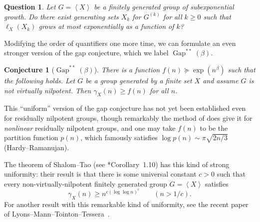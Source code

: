 \documentclass[11pt,reqno]{amsart}
\numberwithin{equation}{section}
\newtheorem*{question}{Question}
\newtheorem*{conjecture}{Conjecture}
\theoremstyle{definition}
\theoremstyle{remark}
\newcommand\opr[1]{\operatorname{#1}}
\newcommand\gen[1]{\left\langle#1\right\rangle}
\def\Gap{\opr{Gap}}
\numberwithin{equation}{section}
\begin{document}
\begin{question}
    Let $G = \gen X$ be a finitely generated group of subexponential growth.
    Do there exist generating sets $X_k$ for $G^{(k)}$ for all $k \ge 0$ such that $\ell_X(X_k)$ grows at most exponentially as a function of $k$?
\end{question}

Modifying the order of quantifiers one more time, we can formulate an even stronger version of the gap conjecture, which we label $\Gap^{**}(\beta)$.

\begin{conjecture}[$\Gap^{**}(\beta)$]
    There is a function $f(n) \succeq \exp(n^\beta)$ such that the following holds.
    Let $G$ be a group generated by a finite set $X$ and assume $G$ is not virtually nilpotent. Then $\gamma_X(n) \ge f(n)$ for all $n$.
\end{conjecture}

This ``uniform'' version of the gap conjecture has not yet been established even for residually nilpotent groups, though remarkably the method of \cites{Grig-gap-for-residually-nilpotent,lubotzky--mann} does give it for \emph{nonlinear} residually nilpotent groups, and one may take $f(n)$ to be the partition function $p(n)$, which famously satisfies
$\log p(n) \sim \pi \sqrt{2n/3}$
(Hardy--Ramanujan).

The theorem of Shalom--Tao (see \cite{shalom-tao}*{Corollary~1.10}) has this kind of strong uniformity: their result is that there is some universal constant $c > 0$ such that every non-virtually-nilpotent finitely generated group $G = \gen {X}$ satisfies
\[
    \gamma_X(n) \ge n^{c (\log \log n)^c} \qquad (n > 1/c).
\]
For another result with this remarkable kind of uniformity, see the recent paper of Lyons--Mann--Tointon--Tessera~\cite{LMTT}.



\end{document}
